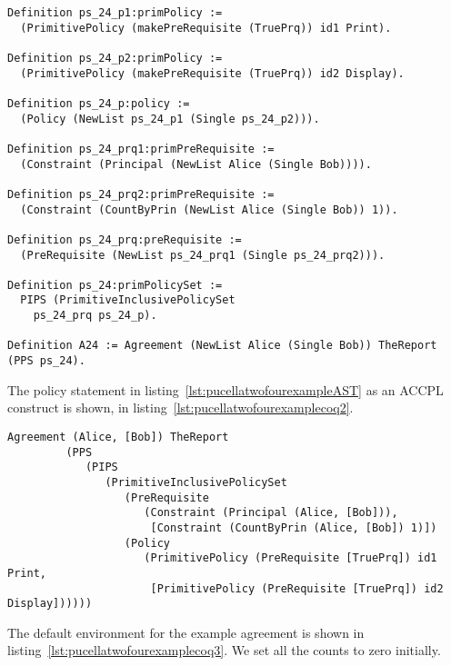 \begin{minipage}[c]{0.95\textwidth}
\begin{lstlisting}
Definition ps_24_p1:primPolicy := 
  (PrimitivePolicy (makePreRequisite (TruePrq)) id1 Print).

Definition ps_24_p2:primPolicy := 
  (PrimitivePolicy (makePreRequisite (TruePrq)) id2 Display).

Definition ps_24_p:policy := 
  (Policy (NewList ps_24_p1 (Single ps_24_p2))).

Definition ps_24_prq1:primPreRequisite := 
  (Constraint (Principal (NewList Alice (Single Bob)))).

Definition ps_24_prq2:primPreRequisite := 
  (Constraint (CountByPrin (NewList Alice (Single Bob)) 1)).
 
Definition ps_24_prq:preRequisite := 
  (PreRequisite (NewList ps_24_prq1 (Single ps_24_prq2))).

Definition ps_24:primPolicySet :=
  PIPS (PrimitiveInclusivePolicySet
    ps_24_prq ps_24_p).

Definition A24 := Agreement (NewList Alice (Single Bob)) TheReport (PPS ps_24).
\end{lstlisting}
\end{minipage} 

The policy statement in listing~\ref{lst:pucellatwofourexampleAST} as an \ac{ACCPL} construct is shown, in listing~\ref{lst:pucellatwofourexamplecoq2}.

\begin{minipage}[c]{0.95\textwidth}
\begin{lstlisting}
Agreement (Alice, [Bob]) TheReport
         (PPS
            (PIPS
               (PrimitiveInclusivePolicySet
                  (PreRequisite
                     (Constraint (Principal (Alice, [Bob])),
                      [Constraint (CountByPrin (Alice, [Bob]) 1)])
                  (Policy
                     (PrimitivePolicy (PreRequisite [TruePrq]) id1 Print,
                      [PrimitivePolicy (PreRequisite [TruePrq]) id2 Display])))))
\end{lstlisting}
\end{minipage} 

The default environment for the example agreement is shown in listing~\ref{lst:pucellatwofourexamplecoq3}. We set all the counts to zero initially.


